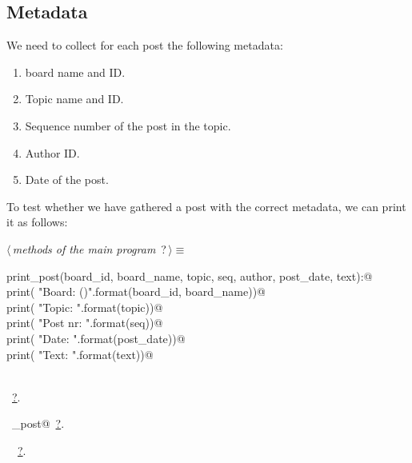 \documentclass[twoside]{artikel3}
\renewcommand{\NWlink}[2]{\hyperlink{#1}{#2}}
\renewcommand{\NWtarget}[2]{\hypertarget{#1}{#2}}
\renewcommand{\NWsep}{$\diamond$\rule[-1\baselineskip]{0pt}{1\baselineskip}}
\renewcommand{\NWlink}[2]{\hyperlink{#1}{#2}}
\renewcommand{\NWtarget}[2]{\hypertarget{#1}{#2}}
\begin{document}
\subsection{Metadata}
\label{sec:metadata}

We need to collect for each post the following metadata:
\begin{enumerate}
\item board name and ID.
\item Topic name and ID.
\item Sequence number of the post in the topic.
\item Author ID.
\item Date of the post.
\end{enumerate}

To test whether we have gathered a post with the correct metadata, we
can print it as follows:

\begin{flushleft} \small
\begin{minipage}{\linewidth}\label{scrap1}\raggedright\small
\NWtarget{nuweb?}{} $\langle\,${\itshape methods of the main program}\nobreak\ {\footnotesize {?}}$\,\rangle\equiv$
\vspace{-1ex}
\begin{list}{}{} \item
\mbox{}\verb@def print_post(board_id, board_name, topic, seq, author, post_date, text):@\\
\mbox{}\verb@    print( "Board:   {} ({})".format(board_id, board_name))@\\
\mbox{}\verb@    print( "Topic:   {}".format(topic))@\\
\mbox{}\verb@    print( "Post nr: {}".format(seq))@\\
\mbox{}\verb@    print( "Date:    {}".format(post_date))@\\
\mbox{}\verb@    print( "Text: {}".format(text))@\\
\mbox{}\verb@@\\
\mbox{}\verb@@{\NWsep}
\end{list}
\vspace{-1.5ex}
\footnotesize
\begin{list}{}{\setlength{\itemsep}{-\parsep}\setlength{\itemindent}{-\leftmargin}}
\item \NWtxtMacroRefIn\ \NWlink{nuweb?}{?}.
\item \NWtxtIdentsDefed\nobreak\  \verb@print_post@\nobreak\ \NWlink{nuweb?}{?}.\item \NWtxtIdentsUsed\nobreak\  \verb@print@\nobreak\ \NWlink{nuweb?}{?}.
\item{}
\end{list}
\end{minipage}\vspace{4ex}
\end{flushleft}
\end{document}
